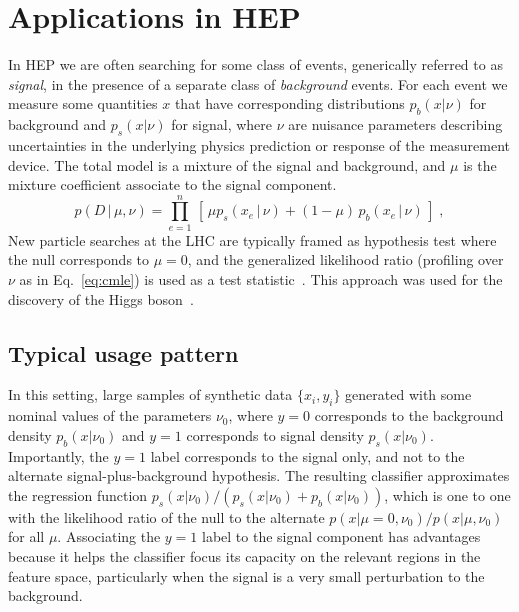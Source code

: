 \documentclass[11pt, oneside]{article}   	%
\begin{document}
\section{Applications in HEP}

In HEP we are often searching for some 
class of events, generically referred to as \textit{signal}, in the presence of a separate class 
of \textit{background} events.  For each event we measure some quantities $x$ that have corresponding distributions 
$p_b(x|\nu)$ for background and $p_s(x|\nu)$ for signal, where $\nu$ are nuisance parameters describing 
uncertainties in the underlying physics prediction or response of the measurement device. The 
total model is a mixture of the signal and background, and $\mu$ is the mixture coefficient associate 
to the signal component. 
\begin{equation}\label{eq:hepGen}
p( D \,|\, \mu, \nu) = \prod_{e=1}^n \, \left[\, \mu p_s( x_e \, |\,  \nu)  + (1-\mu)\, p_b( x_e \,|\, \nu) \,\right] \; ,
\end{equation}
New particle searches at the LHC are typically framed as hypothesis test where the null corresponds to $\mu=0$, and the
generalized likelihood ratio (profiling over $\nu$ as in Eq.~\ref{eq:cmle}) is used as a test statistic~\citep{Cowan:2010js}. This approach was used for the discovery of the Higgs boson~\citep{Aad:2012tfa,Chatrchyan:2012ufa}.


\subsection{Typical usage pattern}

In this setting, large samples of synthetic data $\{x_i, y_i\}$ generated with some nominal values of the parameters $\nu_0$, where $y=0$ corresponds to the background density $p_b(x|\nu_0)$  and $y=1$ corresponds to signal density $p_s(x|\nu_0)$. Importantly, the $y=1$ label corresponds to the signal only, and not to the alternate signal-plus-background hypothesis. The resulting classifier approximates the regression function $p_s(x|\nu_0)/(p_s(x|\nu_0)+p_b(x|\nu_0))$, which is one to one with the likelihood ratio of the null to the alternate $p(x|\mu=0,\nu_0)/p(x|\mu,\nu_0)$ for all $\mu$. Associating the $y=1$ label to the signal component has advantages because it helps the classifier focus its capacity on the relevant regions in the feature space, particularly when the signal is a very small perturbation to the background. 
\end{document}
